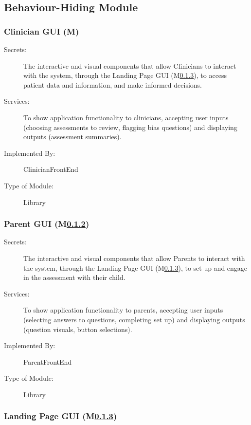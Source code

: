 \documentclass[12pt, titlepage]{article}
\newcounter{mnum}
\newcommand{\mthemnum}{M\themnum}
\newcommand{\mref}[1]{M\ref{#1}}
\begin{document}
\subsection{Behaviour-Hiding Module}

\subsubsection{Clinician GUI (\mthemnum)}
\label{mClinicianGUI}
\begin{description}
\item[Secrets:]The interactive and visual components that allow Clinicians to interact with the system, through the Landing Page GUI (\mref{mAppController}),
               to access patient data and information, and make informed decisions.
\item[Services:]To show application functionality to clinicians, accepting user inputs (choosing assessments to review,
                flagging bias questions) and displaying outputs (assessment summaries).
\item[Implemented By:] ClinicianFrontEnd
\item[Type of Module:] Library
\end{description}

\subsubsection{Parent GUI (\mref{mParentGUI})}
\label{mParentGUI}

\begin{description}
\item[Secrets:]The interactive and visual components that allow Parents to interact with the system, through the Landing Page GUI (\mref{mAppController}),
               to set up and engage in the assessment with their child.
\item[Services:] To show application functionality to parents, accepting user inputs (selecting answers to questions,
                 completing set up) and displaying outputs (question visuals, button selections).
\item[Implemented By:] ParentFrontEnd
\item[Type of Module:] Library
\end{description}

\subsubsection{Landing Page GUI (\mref{mAppController})}
\label{mAppController}
  
\end{document}
